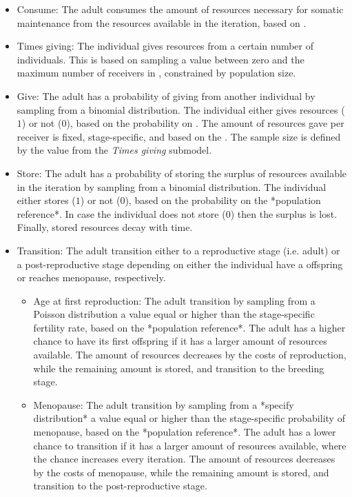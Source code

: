\documentclass{article}
\begin{document}
\begin{itemize}
\begin{itemize}
        \item Consume: The adult consumes the amount of resources necessary for somatic maintenance from the resources available in the iteration, based on \cite{kaplan2000theory}.
        \item Times giving: The individual gives resources from a certain number of individuals. This is based on sampling a value between zero and the maximum number of receivers in \cite{gurven2004give}, constrained by population size.
        \item Give: The adult has a probability of giving from another individual by sampling from a binomial distribution. The individual either gives resources ($1$) or not ($0$), based on the probability on \cite{gurven2004give}. The amount of resources gave per receiver is fixed, stage-specific, and based on the \cite{gurven2004give}. The sample size is defined by the value from the \emph{Times giving} submodel. 
        \item Store: The adult has a probability of storing the surplus of resources available in the iteration by sampling from a binomial distribution. The individual either stores ($1$) or not ($0$), based on the probability on the *population reference*. In case the individual does not store ($0$) then the surplus is lost. Finally, stored resources decay with time.
        \item Transition: The adult transition either to a reproductive stage (i.e. adult) or a post-reproductive stage depending on either the individual have a offspring or reaches menopause, respectively.
        \begin{itemize}
            \item Age at first reproduction: The adult transition by sampling from a Poisson distribution a value equal or higher than the stage-specific fertility rate, based on the *population reference*. The adult has a higher chance to have its first offspring if it has a larger amount of resources available. The amount of resources decreases by the costs of reproduction, while the remaining amount is stored, and transition to the breeding stage.
            \item Menopause: The adult transition by sampling from a *specify distribution* a value equal or higher than the stage-specific probability of menopause, based on the *population reference*. The adult has a lower chance to transition if it has a larger amount of resources available, where the chance increases every iteration. The amount of resources decreases by the costs of menopause, while the remaining amount is stored, and transition to the post-reproductive stage.

\end{itemize}
\end{itemize}
\end{itemize}
\end{document}
